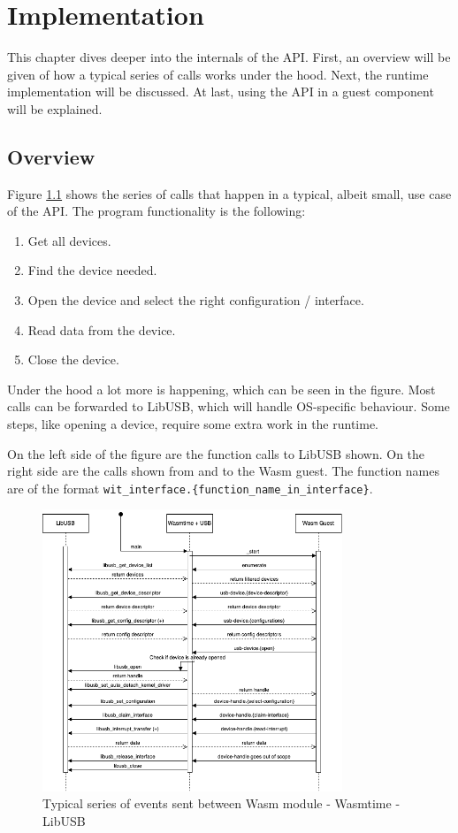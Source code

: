 \chapter{Implementation}
\label{chapter:implementation}
This chapter dives deeper into the internals of the API. First, an overview will be given of how a typical series of calls works under the hood. Next, the runtime implementation will be discussed. At last, using the \acrshort{API} in a guest component will be explained.

\section{Overview}

Figure \ref{fig:implementation_overview} shows the series of calls that happen in a typical, albeit small, use case of the API. The program functionality is the following:
\begin{enumerate}
\item Get all devices.
\item Find the device needed.
\item Open the device and select the right configuration / interface.
\item Read data from the device.
\item Close the device.
\end{enumerate}

Under the hood a lot more is happening, which can be seen in the figure. Most calls can be forwarded to LibUSB, which will handle OS-specific behaviour. Some steps, like opening a device, require some extra work in the runtime.

On the left side of the figure are the function calls to LibUSB shown. On the right side are the calls shown from and to the \acrshort{Wasm} guest. The function names are of the format \texttt{wit\_interface.\{function\_name\_in\_interface\}}.

\begin{figure}[h]
  \centering
  \includegraphics[width=0.8\textwidth]{images/sequentiediagram.png}
  \caption{Typical series of events sent between Wasm module - Wasmtime - LibUSB}
  \label{fig:implementation_overview}
\end{figure}


